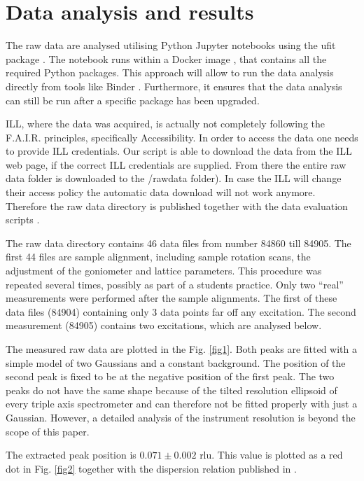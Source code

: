 \documentclass[aps,prx,reprint,amsmath,amssymb,superscriptaddress,showpacs]{revtex4-1}
\begin{document}
\section{Data analysis and results}

The raw data are analysed utilising Python Jupyter notebooks \cite{jupyter} using the ufit package \cite{ufit}.
The notebook \cite{data-evaluation} runs within a Docker image \cite{Docker}, that contains all the required Python packages.
This approach will allow to run the data analysis \cite{data-docker} directly from tools like Binder \cite{binder}.
Furthermore, it ensures that the data analysis can still be run after a specific package has been upgraded.

ILL, where the data was acquired, is actually not completely following the F.A.I.R. principles, specifically Accessibility. 
In order to access the data one needs to provide ILL credentials. 
Our script is able to download the data from the ILL web page, if the correct ILL credentials are supplied. 
From there the entire raw data folder is downloaded to the /rawdata folder). 
In case the ILL will change their access policy the automatic data download will not work anymore. 
Therefore the raw data directory is published together with the data evaluation scripts \cite{data-evaluation}.

The raw data directory contains 46 data files from number 84860 till 84905. 
The first 44 files are sample alignment, including sample rotation scans, the adjustment of the goniometer and lattice parameters. 
This procedure was repeated several times, possibly as part of a students practice.
Only two ``real'' measurements were performed after the sample alignments.
The first of these data files (84904) containing only 3 data points far off any excitation.
The second measurement (84905) contains two excitations, which are analysed below.

The measured raw data are plotted in the Fig. \ref{fig1}.
Both peaks are fitted with a simple model of two Gaussians and a constant background. 
The position of the second peak is fixed to be at the negative position of the first peak. 
The two peaks do not have the same shape because of the tilted resolution ellipsoid of every triple axis spectrometer and can therefore not be fitted properly with just a Gaussian. 
However, a detailed analysis of the instrument resolution is beyond the scope of this paper.

The extracted peak position is $0.071 \pm  0.002$ rlu. 
This value is plotted as a red dot in Fig. \ref{fig2} together with the dispersion relation published in \cite{Aouissi}.
\end{document}

